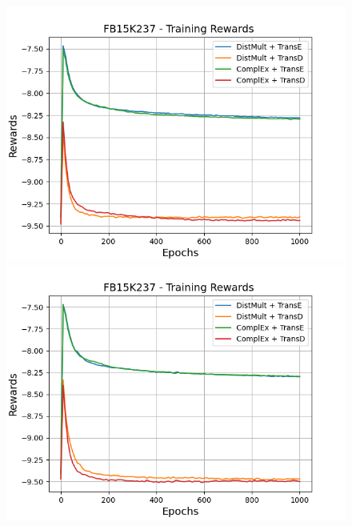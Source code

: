 \begin{figure}[H]
    \centering
    \begin{minipage}{.45\textwidth}
      \centering
      \includegraphics[width=0.9\linewidth]{figures/results/gan_train/not_pretrained/uncertainty/max_distribution/entropy/fb15k237/1k_epochs/uncertainty_fb15k237_rew.png}
    \end{minipage}%
    \begin{minipage}{.45\textwidth}
      \centering
      \includegraphics[width=0.9\linewidth]{figures/results/gan_train/not_pretrained/uncertainty/max_distribution/least_confidence/fb15k237/uncertainty_fb15k237_rew.png}
    \end{minipage}
    \begin{minipage}{.45\textwidth}
      \centering

\end{minipage}
\end{figure}
